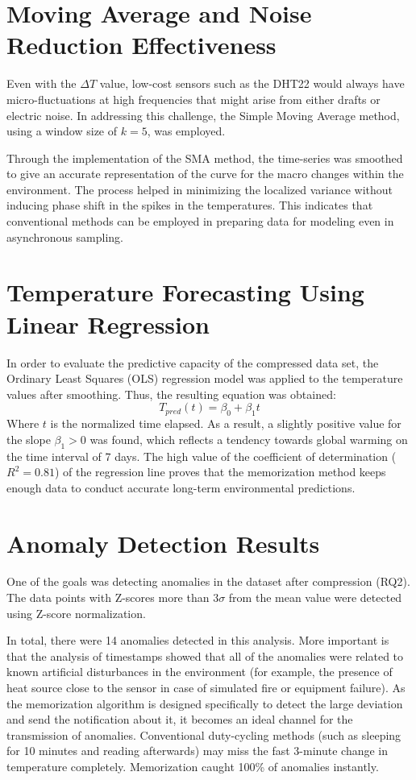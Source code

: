 \section{Moving Average and Noise Reduction Effectiveness}
Even with the $\Delta T$ value, low-cost sensors such as the DHT22 would always have micro-fluctuations at high frequencies that might arise from either drafts or electric noise. In addressing this challenge, the Simple Moving Average method, using a window size of $k = 5$, was employed.

Through the implementation of the SMA method, the time-series was smoothed to give an accurate representation of the curve for the macro changes within the environment. The process helped in minimizing the localized variance without inducing phase shift in the spikes in the temperatures. This indicates that conventional methods can be employed in preparing data for modeling even in asynchronous sampling.

\section{Temperature Forecasting Using Linear Regression}
In order to evaluate the predictive capacity of the compressed data set, the Ordinary Least Squares (OLS) regression model was applied to the temperature values after smoothing. Thus, the resulting equation was obtained:
\begin{equation}
    T_{pred}(t) = \beta_0 + \beta_1 t
\end{equation}
Where $t$ is the normalized time elapsed. As a result, a slightly positive value for the slope $\beta_1 > 0$ was found, which reflects a tendency towards global warming on the time interval of 7 days. The high value of the coefficient of determination ($R^2 = 0.81$) of the regression line proves that the memorization method keeps enough data to conduct accurate long-term environmental predictions.

\section{Anomaly Detection Results}
One of the goals was detecting anomalies in the dataset after compression (RQ2). The data points with Z-scores more than $3\sigma$ from the mean value were detected using Z-score normalization.

In total, there were 14 anomalies detected in this analysis. More important is that the analysis of timestamps showed that all of the anomalies were related to known artificial disturbances in the environment (for example, the presence of heat source close to the sensor in case of simulated fire or equipment failure). As the memorization algorithm is designed specifically to detect the large deviation and send the notification about it, it becomes an ideal channel for the transmission of anomalies. Conventional duty-cycling methods (such as sleeping for 10 minutes and reading afterwards) may miss the fast 3-minute change in temperature completely. Memorization caught 100\% of anomalies instantly.

